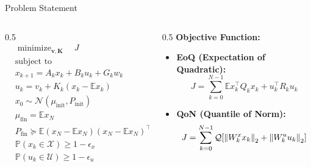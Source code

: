 \documentclass{beamer}
\newcommand{\E}{\mathbb{E}}
\newcommand{\normal}{\mathcal{N}}
\DeclareMathOperator*{\minimize}{minimize}
\begin{document}
\begin{frame}{Problem Statement}
\begin{columns}
\begin{column}{0.5\textwidth}
\begin{align*}
&\minimize_{\boldsymbol{v}, \boldsymbol{K}} \quad J \\
&\text{subject to} \\
& x_{k+1} = A_k x_k + B_k u_k + G_k w_k \\
& u_k = v_k + K_k (x_k - \E{x_k}) \\
& x_0 \sim \normal(\mu_{\mathrm{init}}, P_{\mathrm{init}}) \\
& \mu_{\mathrm{fin}} = \E{x_N} \\
& P_{\mathrm{fin}} \succeq \E{(x_N - \E{x_N})(x_N - \E{x_N})^\top} \\
& \mathbb{P}(x_k \in \mathcal{X}) \geq 1 - \epsilon_x \\
& \mathbb{P}(u_k \in \mathcal{U}) \geq 1 - \epsilon_u
\end{align*}
\end{column}
\begin{column}{0.5\textwidth}
\textbf{Objective Function:}
\begin{itemize}
    \item \textbf{EoQ (Expectation of Quadratic):}
    \[
    J = \sum_{k=0}^{N-1} \E{x_k^\top Q_k x_k + u_k^\top R_k u_k}
    \]
    \item \textbf{QoN (Quantile of Norm):}
    \[
    J = \sum_{k=0}^{N-1} \mathcal{Q}[\norm{W_k^x x_k}_2 + \norm{W_k^u u_k}_2]
    \]
\end{itemize}
\end{column}
\end{columns}
\end{frame}
\end{document}
